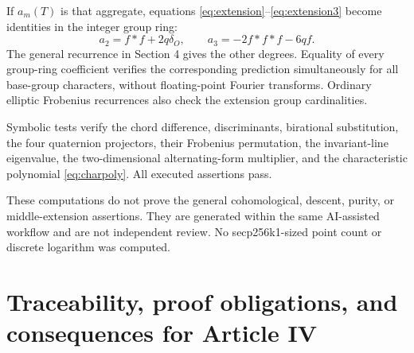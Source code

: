 \documentclass[11pt,a4paper]{article}
\numberwithin{equation}{section}
\begin{document}
If $a_m(T)$ is that aggregate, equations \eqref{eq:extension}--\eqref{eq:extension3} become identities in the integer group ring:
\begin{equation}
 a_2=f*f+2q\delta_O,\qquad
 a_3=-2f*f*f-6qf.
\end{equation}
The general recurrence in Section 4 gives the other degrees. Equality of every group-ring coefficient verifies the corresponding prediction simultaneously for all base-group characters, without floating-point Fourier transforms. Ordinary elliptic Frobenius recurrences also check the extension group cardinalities.

Symbolic tests verify the chord difference, discriminants, birational substitution, the four quaternion projectors, their Frobenius permutation, the invariant-line eigenvalue, the two-dimensional alternating-form multiplier, and the characteristic polynomial \eqref{eq:charpoly}. All executed assertions pass.

These computations do not prove the general cohomological, descent, purity, or middle-extension assertions. They are generated within the same AI-assisted workflow and are not independent review. No secp256k1-sized point count or discrete logarithm was computed.

\section{Traceability, proof obligations, and consequences for Article IV}
\end{document}

